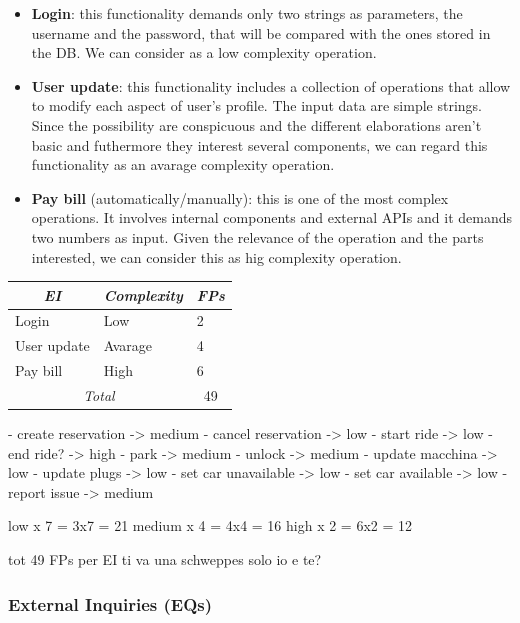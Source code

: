 \documentclass[english]{article}
\begin{document}
\begin{itemize}
	\item{\textbf{Login}: this functionality demands only two strings as parameters, the username and the password, that will be compared with the ones stored in the DB. We can consider as a low complexity operation.}
	
	\item{\textbf{User update}: this functionality includes a collection of operations that allow to modify each aspect of user's profile. The input data are simple strings. Since the possibility are conspicuous and the different elaborations aren't basic and futhermore they interest several components, we can regard this functionality as an avarage complexity operation.}
	
	\item{\textbf{Pay bill} (automatically/manually): this is one of the most complex operations. It involves internal components and external APIs and it demands two numbers as input. Given the relevance of the operation and the parts interested, we can consider this as hig complexity operation.}
\end{itemize}

	\begin{center}
	\begin{tabular}{ | p{6cm} | p{6cm} | p{6cm} }
		\hline
		\multicolumn{1}{|c|}{\textit{EI}} & \multicolumn{1}{c|}{\textit{Complexity}} & \multicolumn{1}{c|}{\textit{FPs}} \\
		\hline
		Login & Low & 2 \\
		\hline
		User update & Avarage & 4\\
		\hline
		Pay bill & High & 6\\
		\hline
		\multicolumn{2}{|c|}{\textit{Total}} & \multicolumn{1}{c|}{49}\\
	\end{tabular}
\end{center}

- create reservation -> medium
- cancel reservation -> low
- start ride -> low
- end ride? -> high
- park -> medium 
- unlock -> medium
- update macchina -> low
- update plugs -> low
- set car unavailable -> low
- set car available -> low
- report issue -> medium

low x 7 = 3x7 = 21
medium x 4 = 4x4 = 16
high x 2 = 6x2 = 12

tot 49 FPs per EI ti va una schweppes solo io e te?


\subsubsection{External Inquiries (EQs)}
\end{document}
